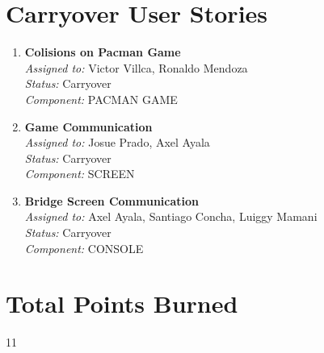     \section*{Carryover User Stories}

    \begin{enumerate}
        \item \textbf{Colisions on Pacman Game} \\
        \textit{Assigned to:} Victor Villca, Ronaldo Mendoza \\
        \textit{Status:} Carryover \\
        \textit{Component:} PACMAN GAME
        \item \textbf{Game Communication} \\
        \textit{Assigned to:} Josue Prado, Axel Ayala \\
        \textit{Status:} Carryover \\
        \textit{Component:} SCREEN
        \item \textbf{Bridge Screen Communication } \\
        \textit{Assigned to:} Axel Ayala, Santiago Concha, Luiggy Mamani \\
        \textit{Status:} Carryover \\
        \textit{Component:} CONSOLE
    \end{enumerate}

    \section*{Total Points Burned}
    11

